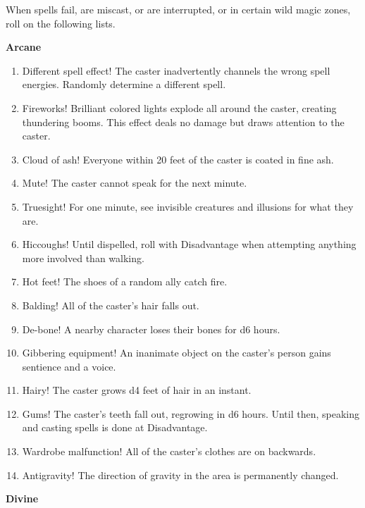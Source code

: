 \documentclass[twoside]{article}
\begin{document}
When spells fail, are miscast, or are interrupted, or in certain wild magic zones, roll on the following lists.

\bigbreak

\textbf{Arcane}

\begin{enumerate}[nosep]
\item Different spell effect! The caster inadvertently channels the wrong spell energies. Randomly determine a different spell.
\item Fireworks! Brilliant colored lights explode all around the caster, creating thundering booms. This effect deals no damage but draws attention to the caster.
\item Cloud of ash! Everyone within 20 feet of the caster is coated in fine ash.
\item Mute! The caster cannot speak for the next minute.
\item Truesight! For one minute, see invisible creatures and illusions for what they are.
\item Hiccoughs! Until dispelled, roll with Disadvantage when attempting anything more involved than walking.
\item Hot feet! The shoes of a random ally catch fire.
\item Balding! All of the caster's hair falls out.
\item De-bone! A nearby character loses their bones for d6 hours.
\item Gibbering equipment! An inanimate object on the caster's person gains sentience and a voice.
\item Hairy! The caster grows d4 feet of hair in an instant.
\item Gums! The caster's teeth fall out, regrowing in d6 hours. Until then, speaking and casting spells is done at Disadvantage.
\item Wardrobe malfunction! All of the caster's clothes are on backwards.
\item Antigravity! The direction of gravity in the area is permanently changed.
\end{enumerate}

\bigbreak

\textbf{Divine}
\end{document}
